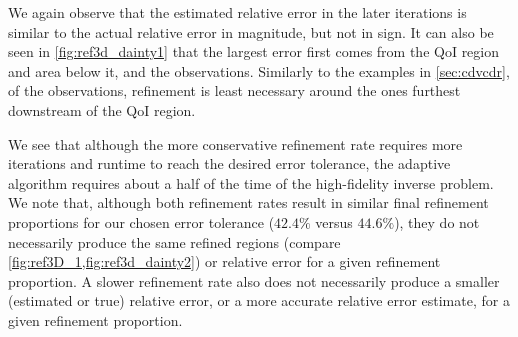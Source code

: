 %
We again observe that the estimated relative error in the later iterations is similar to the actual relative error in magnitude, but not in sign. It can also be seen in \cref{fig:ref3d_dainty1} that the largest error first comes from the QoI region and area below it, and the observations. Similarly to the examples in \cref{sec:cdvcdr}, of the observations, refinement is least necessary around the ones furthest downstream of the QoI region.

We see that although the more conservative refinement rate requires more iterations and runtime to reach the desired error tolerance, the adaptive algorithm requires about a half of the time of the high-fidelity inverse problem. We note that, although both refinement rates result in similar final refinement proportions for our chosen error tolerance ($42.4\%$ versus $44.6\%$), they do not necessarily produce the same refined regions (compare \cref{fig:ref3D_1,fig:ref3d_dainty2}) or relative error for a given refinement proportion. A slower refinement rate also does not necessarily produce a smaller (estimated or true) relative error, or a more accurate relative error estimate, for a given refinement proportion.

